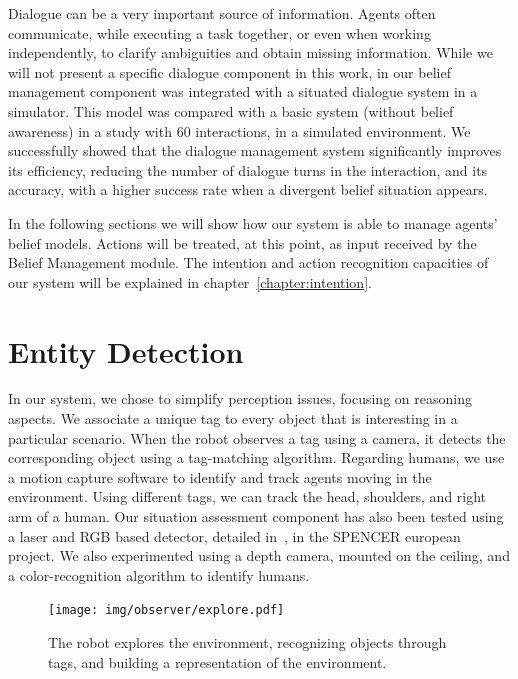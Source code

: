 Dialogue can be a very important source of information. Agents often communicate, while executing a task together, or even when working independently, to clarify ambiguities and obtain missing information. While we will not present a specific dialogue component in this work,  in \cite{Ferreira2015} our belief management component was integrated with a situated dialogue system in a simulator. This model was compared with a basic system (without belief awareness) in a study with 60 interactions, in a simulated environment. We successfully showed that the dialogue management system significantly improves its efficiency, reducing the number of dialogue turns in the interaction, and its accuracy, with a higher success rate when a divergent belief situation appears.

In the following sections we will show how our system is able to manage agents' belief models. Actions will be treated, at this point, as input received by the Belief Management module. The intention and action recognition capacities of our system will be explained in chapter~\ref{chapter:intention}. 

\section{Entity Detection}
\label{sec:belief_management-entity_detection}
In our system, we chose to simplify perception issues, focusing on reasoning aspects. We associate a unique tag to every object that is interesting in a particular scenario. When the robot observes a tag using a camera, it detects the corresponding object using a tag-matching algorithm.
Regarding humans, we use a motion capture software to identify and track agents moving in the environment. Using different tags, we can track the head, shoulders, and right arm of a human. Our situation assessment component has also been tested using a laser and RGB based detector, detailed in~\cite{lindermulti}, in the SPENCER european project. We also experimented using a depth camera, mounted on the ceiling, and a color-recognition algorithm to identify humans. 

 \begin{figure}[ht!]
	\centering
	\texttt{[image: img/observer/explore.pdf]}
	\caption[The robot builds a representation of the environment]{The robot explores the environment, recognizing objects through tags, and building a representation of the environment.}
	\label{fig:belief_management-explore}
\end{figure}

